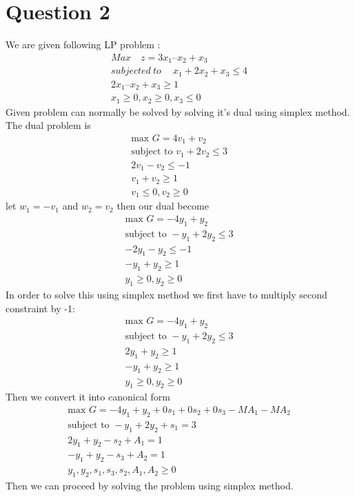 \documentclass[12pt,a4paper]{article}
\begin{document}
	\section*{Question 2}
	
	We are given following LP problem :
	\begin{align}
	Max\quad z = 3x_1 – x_2 + x_3\\
	subjected~to~\quad
	x_1 + 2x_2 + x_3 \leq 4\\
	2x_1 – x _2 + x_3 \geq 1\\
	x_1 \geq 0 , x_2 \geq 0,x_3\leq 0
	\end{align}
	Given problem can normally be solved by solving it's dual using simplex method.\\
	The dual problem is \\
	\begin{align*}
	\text{max } G=4v_1+v_2 \\
	\text{subject to } 
	v_1+2v_2\leq 3\\
	2v_1 - v_2\leq -1\\
	v_1 + v_2 \geq 1\\
	v_1\leq 0, v_2\geq 0
	\end{align*}
	let $w_1=-v_1$ and $w_2 =v_2$ then our dual become
	\begin{align*}
	\text{max } G=-4y_1+y_2 \\
	\text{subject to } 
	-y_1+2y_2\leq 3\\
	-2y_1 - y_2\leq -1\\
	-y_1 + y_2 \geq 1\\
	y_1\geq 0, y_2\geq 0
	\end{align*}
	In order to solve this using simplex method we first have to multiply second constraint by -1:
	\begin{align*}
	\text{max } G=-4y_1+y_2 \\
	\text{subject to } 
	-y_1+2y_2\leq 3\\
	2y_1 + y_2\geq 1\\
	-y_1 + y_2 \geq 1\\
	y_1\geq 0, y_2\geq 0
	\end{align*}
	Then we convert it into canonical form\\
	\begin{align*}
	\text{max } G=-4y_1+y_2+0s_1+ 0s_2+0s_3-MA_1-MA_2 \\
	\text{subject to } 
	-y_1+2y_2+s_1 = 3\\
	2y_1 + y_2 -s_2+A_1 = 1\\
	-y_1 + y_2 -s_3 +A_2 = 1\\
	y_1, y_2,s_1,s_3,s_2,A_1,A_2\geq 0
	\end{align*}
	Then we can proceed by solving the problem using simplex method.\\\\
		
\end{document}

